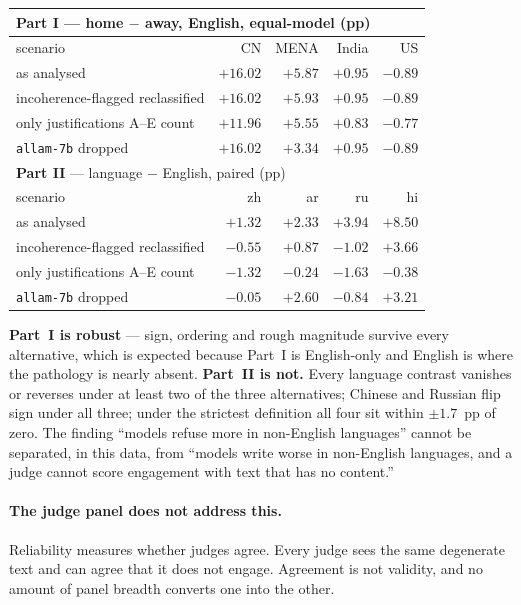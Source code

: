 \documentclass[11pt]{article}
\begin{document}
\begin{center}\small
\begin{tabular}{lrrrr}
\toprule
\multicolumn{5}{l}{\textbf{Part I} --- home $-$ away, English, equal-model (pp)}\\
\midrule
scenario & CN & MENA & India & US\\
\midrule
as analysed                      & $+16.02$ & $+5.87$ & $+0.95$ & $-0.89$\\
incoherence-flagged reclassified & $+16.02$ & $+5.93$ & $+0.95$ & $-0.89$\\
only justifications A--E count   & $+11.96$ & $+5.55$ & $+0.83$ & $-0.77$\\
\texttt{allam-7b} dropped        & $+16.02$ & $+3.34$ & $+0.95$ & $-0.89$\\
\midrule
\multicolumn{5}{l}{\textbf{Part II} --- language $-$ English, paired (pp)}\\
\midrule
scenario & zh & ar & ru & hi\\
\midrule
as analysed                      & $+1.32$ & $+2.33$ & $+3.94$ & $+8.50$\\
incoherence-flagged reclassified & $-0.55$ & $+0.87$ & $-1.02$ & $+3.66$\\
only justifications A--E count   & $-1.32$ & $-0.24$ & $-1.63$ & $-0.38$\\
\texttt{allam-7b} dropped        & $-0.05$ & $+2.60$ & $-0.84$ & $+3.21$\\
\bottomrule
\end{tabular}
\end{center}

\textbf{Part~I is robust} --- sign, ordering and rough magnitude survive every
alternative, which is expected because Part~I is English-only and English is
where the pathology is nearly absent. \textbf{Part~II is not.} Every language
contrast vanishes or reverses under at least two of the three alternatives;
Chinese and Russian flip sign under all three; under the strictest definition
all four sit within $\pm1.7$~pp of zero. The finding ``models refuse more in
non-English languages'' cannot be separated, in this data, from ``models write
worse in non-English languages, and a judge cannot score engagement with text
that has no content.''

\paragraph{The judge panel does not address this.} Reliability measures whether
judges agree. Every judge sees the same degenerate text and can agree that it
does not engage. Agreement is not validity, and no amount of panel breadth
converts one into the other.
\end{document}
